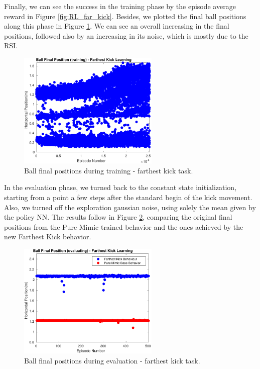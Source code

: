 Finally, we can see the success in the training phase by the episode average reward in Figure \ref{fig:RL_far_kick}. Besides, we plotted the final ball positions along this phase in Figure \ref{fig:RL_far_kick_pos_train}. We can see an overall increasing in the final positions, followed also by an increasing in its noise, which is mostly due to the RSI.

\begin{figure}[H]
    \centering
    \includegraphics[width=0.6\textwidth]{Chapter7/plots/plot_ball_pos_far_kick_train.pdf} 
    \caption{Ball final positions during training - farthest kick task.}
    \label{fig:RL_far_kick_pos_train}
\end{figure}

In the evaluation phase, we turned back to the constant state initialization, starting from a point a few steps after the standard begin of the kick movement. Also, we turned off the exploration gaussian noise, using solely the mean given by the policy NN. The results follow in Figure \ref{fig:RL_far_kick_pos_eval}, comparing the original final positions from the Pure Mimic trained behavior and the ones achieved by the new Farthest Kick behavior.

\begin{figure}[H]
    \centering
    \includegraphics[width=0.6\textwidth]{Chapter7/plots/plot_ball_pos_far_kick_eval.pdf} 
    \caption{Ball final positions during evaluation - farthest kick task.}
    \label{fig:RL_far_kick_pos_eval}
\end{figure}

